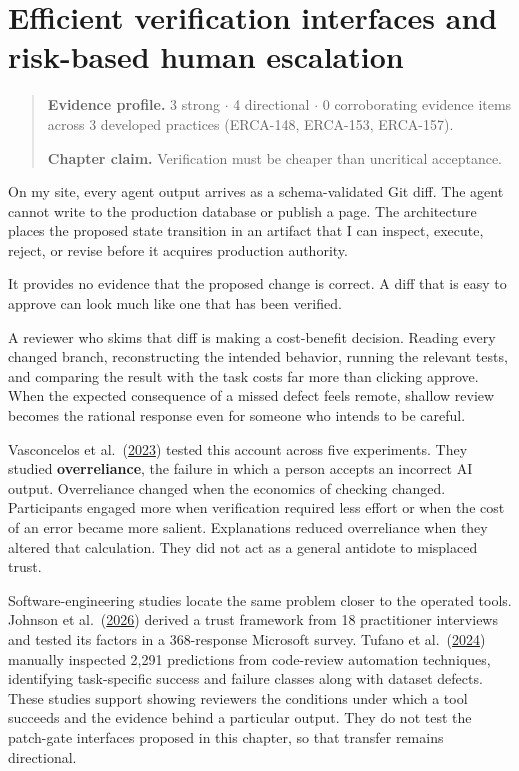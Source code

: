 \chapter{Efficient verification interfaces and risk-based human escalation}
\label{ch15-verification-interfaces-risk-based-escalation}
\begin{quote}
\textbf{Evidence profile.} 3 strong \(\cdot\) 4 directional \(\cdot\) 0 corroborating evidence items across 3 developed practices (ERCA-148, ERCA-153, ERCA-157).

\textbf{Chapter claim.} Verification must be cheaper than uncritical acceptance.
\end{quote}

On my site, every agent output arrives as a schema-validated Git diff. The agent cannot write to the production database or publish a page. The architecture places the proposed state transition in an artifact that I can inspect, execute, reject, or revise before it acquires production authority.

It provides no evidence that the proposed change is correct. A diff that is easy to approve can look much like one that has been verified.

A reviewer who skims that diff is making a cost-benefit decision. Reading every changed branch, reconstructing the intended behavior, running the relevant tests, and comparing the result with the task costs far more than clicking approve. When the expected consequence of a missed defect feels remote, shallow review becomes the rational response even for someone who intends to be careful.

Vasconcelos et al.~(\href{https://arxiv.org/abs/2212.06823}{2023}) tested this account across five experiments. They studied \textbf{overreliance}, the failure in which a person accepts an incorrect AI output. Overreliance changed when the economics of checking changed. Participants engaged more when verification required less effort or when the cost of an error became more salient. Explanations reduced overreliance when they altered that calculation. They did not act as a general antidote to misplaced trust.

Software-engineering studies locate the same problem closer to the operated tools. Johnson et al.~(\href{https://doi.org/10.1145/3772370}{2026}) derived a trust framework from 18 practitioner interviews and tested its factors in a 368-response Microsoft survey. Tufano et al.~(\href{https://doi.org/10.1109/TSE.2023.3348172}{2024}) manually inspected 2,291 predictions from code-review automation techniques, identifying task-specific success and failure classes along with dataset defects. These studies support showing reviewers the conditions under which a tool succeeds and the evidence behind a particular output. They do not test the patch-gate interfaces proposed in this chapter, so that transfer remains directional.

